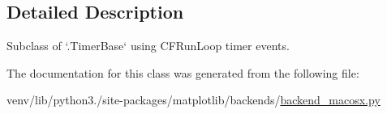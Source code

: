 \subsection{Detailed Description}
\begin{DoxyVerb}Subclass of `.TimerBase` using CFRunLoop timer events.\end{DoxyVerb}
 

The documentation for this class was generated from the following file\+:\begin{DoxyCompactItemize}
\item 
venv/lib/python3./site-\/packages/matplotlib/backends/\hyperlink{backend__macosx_8py}{backend\+\_\+macosx.\+py}\end{DoxyCompactItemize}
